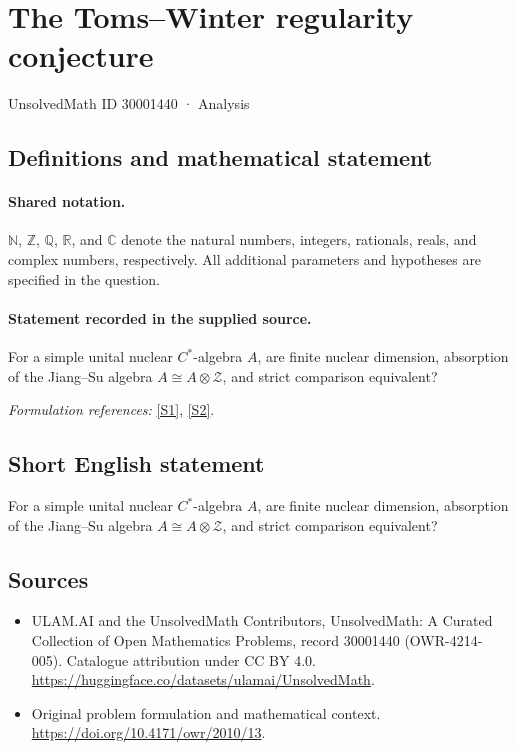 \documentclass[11pt]{article}
\newcommand{\sref}[2]{\hyperlink{source:#1:#2}{[S#2]}}
\begin{document}
\setcounter{section}{30001439}
\section{The Toms–Winter regularity conjecture}\label{30001440}
{\small UnsolvedMath ID 30001440 · Analysis}
\subsection{Definitions and mathematical statement}

\paragraph{Shared notation.}$\mathbb N$, $\mathbb Z$, $\mathbb Q$, $\mathbb R$, and $\mathbb C$ denote the natural numbers, integers, rationals, reals, and complex numbers, respectively. All additional parameters and hypotheses are specified in the question.


\paragraph{Statement recorded in the supplied source.}
For a simple unital nuclear $C^*$-algebra $A$, are finite nuclear dimension, absorption of the Jiang--Su algebra $A\cong A\otimes\mathcal Z$, and strict comparison equivalent?
\par\smallskip\textit{Formulation references:} \sref{30001440}{1}, \sref{30001440}{2}.
\subsection{Short English statement}
For a simple unital nuclear $C^*$-algebra $A$, are finite nuclear dimension, absorption of the Jiang--Su algebra $A\cong A\otimes\mathcal Z$, and strict comparison equivalent?
\subsection{Sources}
\begin{itemize}
\item[\hypertarget{source:30001440:1}{S1}] ULAM.AI and the UnsolvedMath Contributors, UnsolvedMath: A Curated Collection of Open Mathematics Problems, record 30001440 (OWR-4214-005). Catalogue attribution under CC BY 4.0.
\url{https://huggingface.co/datasets/ulamai/UnsolvedMath}.
\item[\hypertarget{source:30001440:2}{S2}] Original problem formulation and mathematical context.
\url{https://doi.org/10.4171/owr/2010/13}.
\end{itemize}
\label{end:30001440}
\end{document}
